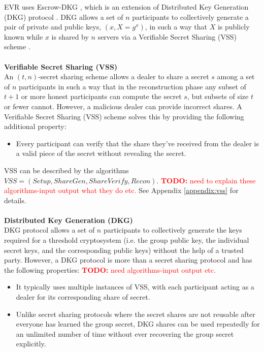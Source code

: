 \documentclass[letterpaper,twocolumn,10pt]{article}
\theoremstyle{definition}
\theoremstyle{remark}
\newcommand{\todo}[1]{\textcolor{red}{\textbf{TODO:} #1}}
\begin{document}
EVR uses Escrow-DKG \cite{david2019rational}, which is an extension of Distributed Key Generation (DKG) protocol \cite{gennaro1999secure, gennaro3revisiting}. DKG allows a set of $n$ participants to collectively generate a pair of private and public keys, $(x,X = g^x )$, in such a way that $X$ is publicly known while $x$ is shared by $n$ servers via a Verifiable Secret Sharing (VSS) scheme \cite{feldman1987practical, pedersen1991non}.\\\\
\textbf{Verifiable Secret Sharing (VSS)}\\
An $(t,n)$-secret sharing scheme allows a dealer to share a secret $s$ among a set of $n$ participants in such a way that in the reconstruction phase any subset of $t+1$ or more honest participants can compute the secret $s$, but subsets of size $t$ or fewer cannot. However, a malicious dealer can provide incorrect shares. A Verifiable Secret Sharing (VSS) scheme solves this by providing the following additional property:
\begin{itemize}
    \item Every participant can verify that the share they've received from the dealer is a valid piece of the secret without revealing the secret.
\end{itemize}
VSS can be described by the algorithms $VSS = (Setup, ShareGen, ShareVerify, Recon)$. \todo{need to explain these algorithms-input output what they do etc.}
See Appendix \ref{appendix:vss} for details.\\\\
\textbf{Distributed Key Generation (DKG)}\\
DKG protocol allows a set of $n$ participants to collectively generate the keys required for a threshold cryptosystem (i.e. the group public key, the individual secret keys, and the corresponding public keys) without the help of a trusted party. However, a DKG protocol is more than a secret sharing protocol and has the following properties:
\todo{need algorithms-input output etc.}
\begin{itemize}
    \item It typically uses multiple instances of VSS, with each participant acting as a dealer for its corresponding share of secret. 
    \item Unlike secret sharing protocols where the secret shares are not reusable after everyone has learned the group secret, DKG shares can be used repeatedly for an unlimited number of time without ever recovering the group secret explicitly.
\end{itemize}
\end{document}
